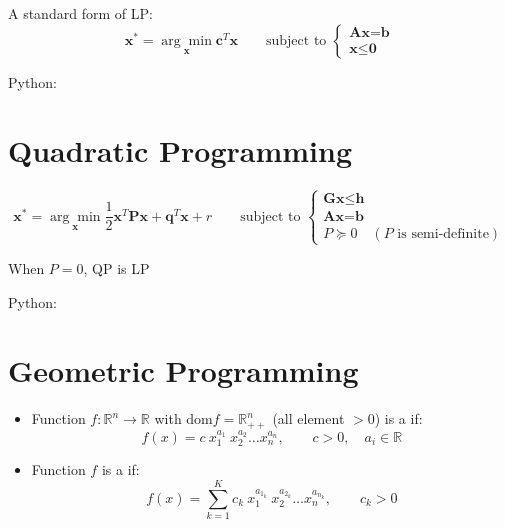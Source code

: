 A standard form of \ac{LP}:
\begin{equation}
	\textbf{x}^* = \underset{\textbf{x}}{\arg\min} \textbf{c}^T \textbf{x} \qquad \text{subject to } \begin{cases}
		\textbf{Ax} = \textbf{b}\\
		\textbf{x} \leq \textbf{0}		
	\end{cases}
\end{equation}

Python: {\color{red} }

\section{Quadratic Programming}
\begin{equation}
	\textbf{x}^* = \underset{\textbf{x}}{\arg\min} \frac{1}{2} \textbf{x}^T\textbf{Px} + \textbf{q}^T\textbf{x} + r \qquad \text{subject to } \begin{cases}
		\textbf{Gx} \leq \textbf{h}\\
		\textbf{Ax} = \textbf{b}\\
		P \succeq 0 \quad (P\text{ is semi-definite})
	\end{cases}
\end{equation}

\note When $P=0$, \ac{QP} is \ac{LP}

Python: {\color{red} }

\section{Geometric Programming}
\begin{itemize}
	\item Function $f: \mathbb{R}^n\rightarrow\mathbb{R}$ with dom$f =\mathbb{R}^n_{++}$ (all element $>0$) is a  if:
	\begin{equation}
		f(x) = c\ x_1^{a_1}\ x_2^{a_2}\dots x_n^{a_n}, \qquad c>0, \quad a_i \in \mathbb{R}
	\end{equation}
	\item Function $f$ is a  if:
	\begin{equation}
		f(x) = \sum_{k=1}^{K} c_k\ x_1^{a_{1_k}}\ x_2^{a_{2_k}}\dots x_n^{a_{n_k}}, \qquad c_k>0
	\end{equation}
\end{itemize}

